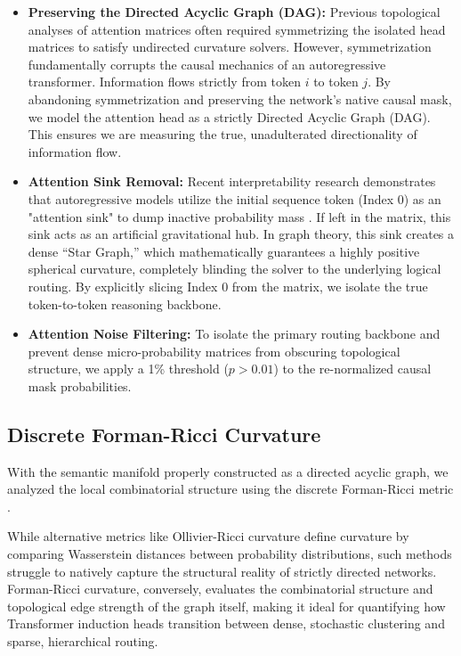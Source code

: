 \documentclass[11pt, a4paper]{article}
\begin{document}
\begin{itemize}
    \item \textbf{Preserving the Directed Acyclic Graph (DAG):} Previous topological analyses of attention matrices often required symmetrizing the isolated head matrices to satisfy undirected curvature solvers. However, symmetrization fundamentally corrupts the causal mechanics of an autoregressive transformer. Information flows strictly from token $i$ to token $j$. By abandoning symmetrization and preserving the network's native causal mask, we model the attention head as a strictly Directed Acyclic Graph (DAG). This ensures we are measuring the true, unadulterated directionality of information flow.
    \item \textbf{Attention Sink Removal:} Recent interpretability research demonstrates that autoregressive models utilize the initial sequence token (Index 0) as an "attention sink" to dump inactive probability mass \cite{xiao2024efficient}. If left in the matrix, this sink acts as an artificial gravitational hub. In graph theory, this sink creates a dense ``Star Graph,'' which mathematically guarantees a highly positive spherical curvature, completely blinding the solver to the underlying logical routing. By explicitly slicing Index 0 from the matrix, we isolate the true token-to-token reasoning backbone.
    \item \textbf{Attention Noise Filtering:} To isolate the primary routing backbone and prevent dense micro-probability matrices from obscuring topological structure, we apply a 1\% threshold ($p > 0.01$) to the re-normalized causal mask probabilities.
\end{itemize}

\subsection{Discrete Forman-Ricci Curvature}
With the semantic manifold properly constructed as a directed acyclic graph, we analyzed the local combinatorial structure using the discrete Forman-Ricci metric \cite{forman2003bochner, sreejith2016forman}.

While alternative metrics like Ollivier-Ricci curvature define curvature by comparing Wasserstein distances between probability distributions, such methods struggle to natively capture the structural reality of strictly directed networks. Forman-Ricci curvature, conversely, evaluates the combinatorial structure and topological edge strength of the graph itself, making it ideal for quantifying how Transformer induction heads transition between dense, stochastic clustering and sparse, hierarchical routing.
\end{document}
